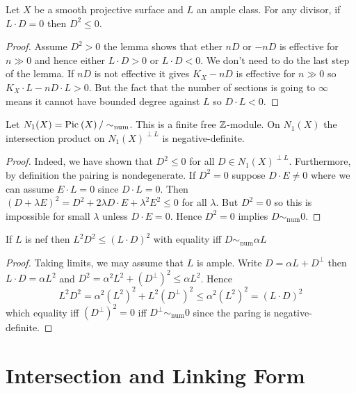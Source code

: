 \documentclass[12pt]{article}
\begin{document}
\begin{theorem}
Let $X$ be a smooth projective surface and $L$ an ample class. For any divisor, if $L \cdot D = 0$ then $D^2 \le 0$.
\end{theorem}

\begin{proof}
Assume $D^2 > 0$ the lemma shows that ether $nD$ or $-nD$ is effective for $n \gg 0$ and hence either $L \cdot D > 0$ or $L \cdot D < 0$. We don't need to do the last step of the lemma. If $nD$ is not effective it gives $K_X - nD$ is effective for $n \gg 0$ so $K_X \cdot L - n D \cdot L > 0$. But the fact that the number of sections is going to $\infty$ means it cannot have bounded degree against $L$ so $D \cdot L < 0$. 
\end{proof}

\begin{corollary}
Let $N_1(X) = \mathrm{Pic}^{} \left( X \right) / \sim_{\text{num}}$. This is a finite free $\mathbb{Z}$-module. On $N_1(X)$ the intersection product on $N_1(X)^{\perp L}$ is negative-definite.
\end{corollary}

\begin{proof}
Indeed, we have shown that $D^2 \le 0$ for all $D \in N_1(X)^{\perp L}$. Furthermore, by definition the pairing is nondegenerate. If $D^2 = 0$ suppose $D \cdot E \neq 0$ where we can assume $E \cdot L = 0$ since $D \cdot L = 0$. Then $(D + \lambda E)^2 = D^2 + 2 \lambda D \cdot E + \lambda^2 E^2 \le 0$ for all $\lambda$. But $D^2 = 0$ so this is impossible for small $\lambda$ unless $D \cdot E = 0$. Hence $D^2 = 0$ implies $D \sim_{\text{num}} 0$. 
\end{proof}

\begin{corollary}
If $L$ is nef then $L^2 D^2 \le (L \cdot D)^2$ with equality iff $D \sim_{\text{num}} \alpha L$
\end{corollary}

\begin{proof}
Taking limits, we may assume that $L$ is ample. Write $D = \alpha L + D^\perp$ then $L \cdot D = \alpha L^2$ and $D^2 = \alpha^2 L^2 + (D^{\perp})^2 \le \alpha L^2$. Hence 
\[ L^2 D^2 = \alpha^2 (L^2)^2 +  L^2 (D^{\perp})^2 \le \alpha^2 (L^2)^2 = (L \cdot D)^2 \]
which equality iff $(D^{\perp})^2 = 0$ iff $D^{\perp} \sim_{\text{num}} 0$ since the paring is negative-definite.
\end{proof}

\section{Intersection and Linking Form}
\end{document}
